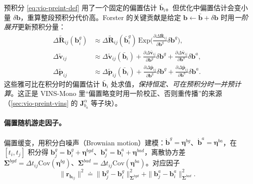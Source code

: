 预积分 \cref{eq:vio-preint-def} 用了一个固定的偏置估计 $\bar{\mathbf{b}}_i$。但优化中偏置估计会变小量 $\delta\mathbf{b}$，重算整段预积分代价高。Forster 的关键贡献是给定 $\mathbf{b}\leftarrow\bar{\mathbf{b}}+\delta\mathbf{b}$ 时用\emph{一阶展开}更新预积分量\cite{forster2017preintegration}：
\begin{equation}
\begin{aligned}
  \Delta\tilde{\mathbf{R}}_{ij}(\mathbf{b}^g_i)&\approx\Delta\tilde{\mathbf{R}}_{ij}(\bar{\mathbf{b}}^g_i)\,\mathrm{Exp}\!\Big(\tfrac{\partial\Delta\bar{\mathbf{R}}_{ij}}{\partial\mathbf{b}^g}\delta\mathbf{b}^g\Big),\\
  \Delta\tilde{\mathbf{v}}_{ij}&\approx\Delta\tilde{\mathbf{v}}_{ij}(\bar{\mathbf{b}}_i)+\tfrac{\partial\Delta\bar{\mathbf{v}}_{ij}}{\partial\mathbf{b}^g}\delta\mathbf{b}^g+\tfrac{\partial\Delta\bar{\mathbf{v}}_{ij}}{\partial\mathbf{b}^a}\delta\mathbf{b}^a,\\
  \Delta\tilde{\mathbf{p}}_{ij}&\approx\Delta\tilde{\mathbf{p}}_{ij}(\bar{\mathbf{b}}_i)+\tfrac{\partial\Delta\bar{\mathbf{p}}_{ij}}{\partial\mathbf{b}^g}\delta\mathbf{b}^g+\tfrac{\partial\Delta\bar{\mathbf{p}}_{ij}}{\partial\mathbf{b}^a}\delta\mathbf{b}^a.
\end{aligned}
  \label{eq:vio-bias-corr}
\end{equation}
这些雅可比在积分时的偏置估计 $\bar{\mathbf{b}}_i$ 处求值，\emph{保持恒定、可在预积分时一并预计算}\cite{forster2017preintegration}。这正是 VINS-Mono 里“偏置略变时用一阶校正、否则重传播”的来源（\cref{sec:vio-preint-vins} 的 $\mathbf{J}^\alpha_{b_a}$ 等子块）。

\paragraph{偏置随机游走因子。}
偏置缓变，用积分白噪声（Brownian motion）建模：$\dot{\mathbf{b}}^g=\boldsymbol{\eta}^{bg}$、$\dot{\mathbf{b}}^a=\boldsymbol{\eta}^{ba}$，在 $[t_i,t_j]$ 积分得 $\mathbf{b}^g_j=\mathbf{b}^g_i+\boldsymbol{\eta}^{bgd}$、$\mathbf{b}^a_j=\mathbf{b}^a_i+\boldsymbol{\eta}^{bad}$，离散协方差 $\boldsymbol{\Sigma}^{bgd}=\Delta t_{ij}\mathrm{Cov}(\boldsymbol{\eta}^{bg})$、$\boldsymbol{\Sigma}^{bad}=\Delta t_{ij}\mathrm{Cov}(\boldsymbol{\eta}^{ba})$。对应因子
\begin{equation}
  \|\mathbf{r}_{\mathbf{b}_{ij}}\|^2\doteq\|\mathbf{b}^g_j-\mathbf{b}^g_i\|^2_{\boldsymbol{\Sigma}^{bgd}}+\|\mathbf{b}^a_j-\mathbf{b}^a_i\|^2_{\boldsymbol{\Sigma}^{bad}}.
  \label{eq:vio-bias-factor}
\end{equation}

